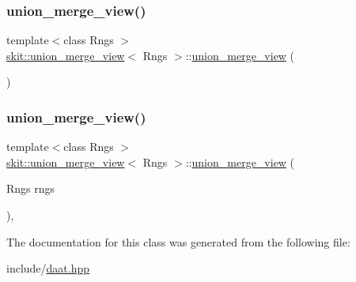 \subsubsection{\texorpdfstring{union\+\_\+merge\+\_\+view()}{union\_merge\_view()}\hspace{0.1cm}{\footnotesize\ttfamily [1/2]}}
{\footnotesize\ttfamily template$<$class Rngs $>$ \\
\hyperlink{classskit_1_1union__merge__view}{skit\+::union\+\_\+merge\+\_\+view}$<$ Rngs $>$\+::\hyperlink{classskit_1_1union__merge__view}{union\+\_\+merge\+\_\+view} (\begin{DoxyParamCaption}{ }\end{DoxyParamCaption})\hspace{0.3cm}{\ttfamily [default]}}

\mbox{\label{classskit_1_1union__merge__view_a8acb6284ab30d1366e782f363ebdba87}} 
\subsubsection{\texorpdfstring{union\+\_\+merge\+\_\+view()}{union\_merge\_view()}\hspace{0.1cm}{\footnotesize\ttfamily [2/2]}}
{\footnotesize\ttfamily template$<$class Rngs $>$ \\
\hyperlink{classskit_1_1union__merge__view}{skit\+::union\+\_\+merge\+\_\+view}$<$ Rngs $>$\+::\hyperlink{classskit_1_1union__merge__view}{union\+\_\+merge\+\_\+view} (\begin{DoxyParamCaption}\item[{Rngs}]{rngs }\end{DoxyParamCaption})\hspace{0.3cm}{\ttfamily [inline]}, {\ttfamily [explicit]}}



The documentation for this class was generated from the following file\+:\begin{DoxyCompactItemize}
\item 
include/\hyperlink{daat_8hpp}{daat.\+hpp}\end{DoxyCompactItemize}
